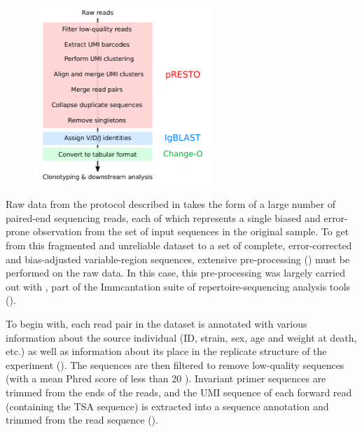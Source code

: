 \begin{figure}
\centering
\includegraphics[width=0.6\textwidth]{_Figures/png_edited/igseq-preprocessing}
\label{fig:igrace-preprocessing}
\vspace{0.5em}
\end{figure}

Raw \igseq data from the protocol described in  takes the form of a large number of paired-end sequencing reads, each of which represents a single biased and error-prone observation from the set of input sequences in the original sample. To get from this fragmented and unreliable dataset to a set of complete, error-corrected and bias-adjusted \igh{} variable-region sequences, extensive pre-processing () must be performed on the raw data. In this case, this pre-processing was largely carried out with  \parencite{vanderheiden2014presto}, part of the Immcantation suite of repertoire-sequencing analysis tools ().

To begin with, each read pair in the dataset is annotated with various information about the source individual (ID, strain, sex, age and weight at death, etc.) as well as information about its place in the replicate structure of the experiment (). The sequences are then filtered to remove low-quality sequences (with a mean Phred score of less than 20 \parencite{ewing1998phred}). Invariant primer sequences are trimmed from the ends of the reads, and the UMI sequence of each forward read (containing the TSA sequence) is extracted into a sequence annotation and trimmed from the read sequence ().

